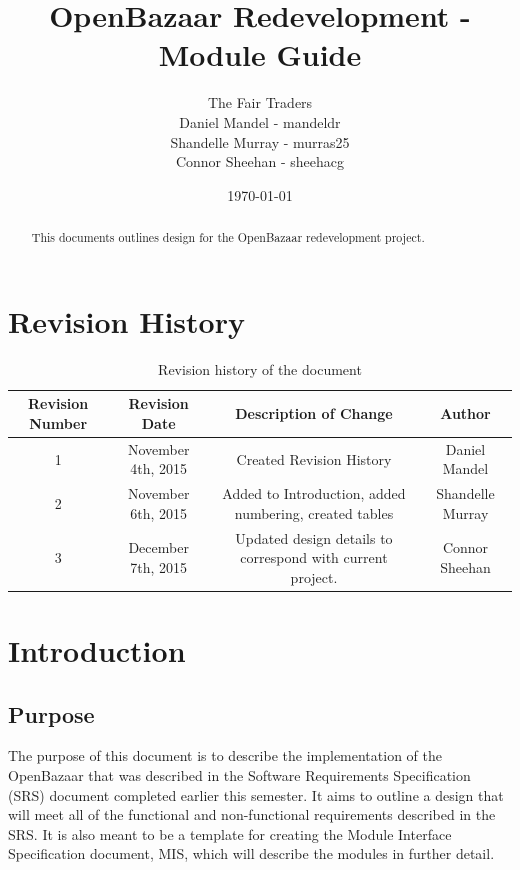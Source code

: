 \documentclass{article}
\begin{document}
\title{OpenBazaar Redevelopment - Module Guide}
\author{The Fair Traders \\ Daniel Mandel - mandeldr \\ Shandelle Murray - murras25 \\ Connor Sheehan - sheehacg}
\date{\today}
\maketitle

\begin{abstract}
This documents outlines design for the OpenBazaar redevelopment project.
\end{abstract}

\newpage

\tableofcontents


\newpage
\section*{Revision History}

\begin{table}[h!]
\begin{center}
\hspace*{-3.5cm}\begin{tabular}{||c c c c||}
 \hline
 Revision Number & Revision Date & Description of Change & Author \\ [0.5ex]
 \hline\hline
 1 & November 4th, 2015 & Created Revision History & Daniel Mandel \\ [1ex]
 \hline
 2 & November 6th, 2015 & Added to Introduction, added numbering, created tables & Shandelle Murray \\ [1ex]
 \hline
 3 & December 7th, 2015 & Updated design details to correspond with current project. & Connor Sheehan \\ [1ex]
 \hline
\end{tabular}
\end{center}
\caption{Revision history of the document}
\label{table:1}
\end{table}

\newpage

\section*{Introduction}
\subsection{Purpose}
The purpose of this document is to describe the implementation of the OpenBazaar that was described in the Software Requirements Specification (SRS) document completed earlier this semester. It aims to outline a design that will meet all of the functional and non-functional requirements described in the SRS. It is also meant to be a template for creating the Module Interface Specification document, MIS, which will describe the modules in further detail. 
\end{document}
